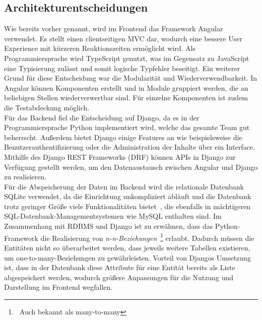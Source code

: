 \documentclass[conference]{IEEEtran}
\begin{document}
\subsection{Architekturentscheidungen}\label{arch-choices}
Wie bereits vorher genannt, wird im Frontend das Framework Angular verwendet. Es stellt einen clientseitigen MVC dar, wodurch eine bessere User Experience mit kürzeren Reaktionszeiten ermöglicht wird. Als Programmiersprache wird TypeScript genutzt, was im Gegensatz zu JavaScript eine Typisierung zulässt und somit logische Typfehler beseitigt. Ein weiterer Grund für diese Entscheidung war die Modularität und Wiederverwendbarkeit. In Angular können Komponenten erstellt und in Module gruppiert werden, die an beliebigen Stellen wiederverwertbar sind. Für einzelne Komponenten ist zudem die Testabdeckung möglich.\\
Für das Backend fiel die Entscheidung auf Django, da es in der Programmiersprache Python implementiert wird, welche das gesamte Team gut beherrscht. Außerdem bietet Django einige Features an wie beispielsweise die Benutzerauthentifizierung oder die Administration der Inhalte über ein Interface.\\
Mithilfe des Django REST Frameworks (DRF) können APIs in Django zur Verfügung gestellt werden, um den Datenaustausch zwischen Angular und Django zu realisieren.\\
Für die Abspeicherung der Daten im Backend wird die relationale Datenbank SQLite verwendet, da die Einrichtung unkompliziert abläuft und die Datenbank trotz geringer Größe viele Funktionalitäten bietet~\cite{sqlite}, die ebenfalls in mächtigeren SQL-Datenbank-Managementsystemen wie MySQL enthalten sind. Im Zusammenhang mit RDBMS und Django ist zu erwähnen, dass das Python-Framework die Realisierung von \textit{n-n-Beziehungen}~\footnote{~Auch bekannt als many-to-many} erlaubt. Dadurch müssen die Entitäten nicht so überarbeitet werden, dass jeweils weitere Tabellen existieren, um one-to-many-Beziehungen zu gewährleisten. Vorteil von Djangos Umsetzung ist, dass in der Datenbank diese Attribute für eine Entität bereits als Liste abgespeichert werden, wodurch größere Anpassungen für die Nutzung und Darstellung im Frontend wegfallen.
\end{document}
